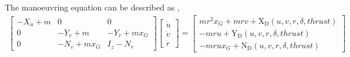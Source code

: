 The manoeuvring equation can be described as \cite{fossen_handbook_2011},
\begin{equation}\label{equation:02.01_manoeuvring models:eqqsystem}
\begin{split}\displaystyle \left[\begin{matrix}- X_{\dot{u}} + m & 0 & 0\\0 & - Y_{\dot{v}} + m & - Y_{\dot{r}} + m x_{G}\\0 & - N_{\dot{v}} + m x_{G} & I_{z} - N_{\dot{r}}\end{matrix}\right] \left[\begin{matrix}\dot{u}\\\dot{v}\\\dot{r}\end{matrix}\right] = \left[\begin{matrix}m r^{2} x_{G} + m r v + \operatorname{X_{D}}{\left(u,v,r,\delta,thrust \right)}\\- m r u + \operatorname{Y_{D}}{\left(u,v,r,\delta,thrust \right)}\\- m r u x_{G} + \operatorname{N_{D}}{\left(u,v,r,\delta,thrust \right)}\end{matrix}\right]\end{split}
\end{equation}


